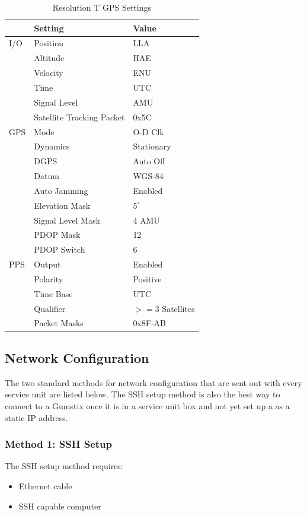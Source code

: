 \begin{table}[h!]
\begin{center}
\begin{tabular}{|p{.5in}|p{2in}|p{1.5in}|}
\hline
{\bf } &	{\bf Setting} &	{\bf Value}\\
\hline
\rule{0pt}{3ex}
I/O	&Position	&	LLA\\ 
	&Altitude	&	HAE\\ 
	&Velocity	&	ENU\\ 
	&Time	&	UTC\\ 
	&Signal Level	&	AMU\\ 
	&Satellite Tracking Packet	&	0x5C\\ 
\hline
GPS	&Mode	&	O-D Clk\\ 
	&Dynamics	&	Stationary\\
	&DGPS	&	Auto Off\\
	&Datum	&	WGS-84\\
	&Auto Jamming	&	Enabled\\
	&Elevation Mask	&	$5^\circ$\\
	&Signal Level Mask	&	4 AMU\\
	&PDOP Mask	&	12\\
	&PDOP Switch	&	6\\
\hline
PPS	&Output	&	Enabled\\ 
	&Polarity	&	Positive\\ 
	&Time Base	&	UTC\\ 
	&Qualifier	&	$>=3$ Satellites\\ 
	&Packet Masks	&	0x8F-AB\\ 
\hline
\end{tabular}
\end{center}
\label{app:suGPSSettings}
\caption{Resolution T GPS Settings}
\end{table}

\subsection{Network Configuration}

The two standard methods for network configuration that are sent out with every service unit are listed below.
The SSH setup method is also the best way to connect to a Gumstix once it is in a service unit box and not yet set up a as a static IP address.


\subsubsection{Method 1: SSH Setup}
The SSH setup method requires:
\begin{itemize}
\item{Ethernet cable}
\item{SSH capable computer}
\end{itemize}

